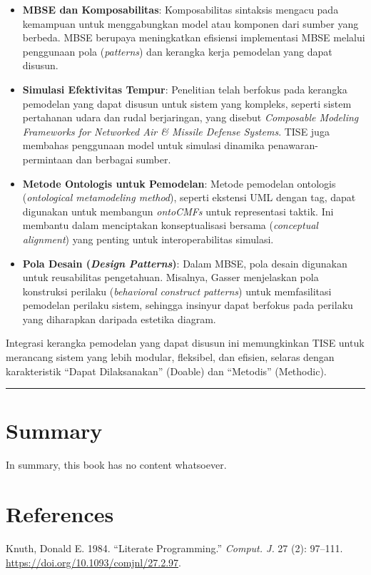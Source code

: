 \documentclass[
  letterpaper,
  DIV=11,
  numbers=noendperiod]{scrreprt}
\newlength{\cslhangindent}
\newenvironment{CSLReferences}[2] %
 {\begin{list}{}{%
  \setlength{\itemindent}{0pt}
  \setlength{\leftmargin}{0pt}
  \setlength{\parsep}{0pt}
  \ifodd #1
   \setlength{\leftmargin}{\cslhangindent}
   \setlength{\itemindent}{-1\cslhangindent}
  \fi
  \setlength{\itemsep}{#2\baselineskip}}}
 {\end{list}}
\providecommand{\tightlist}{%
  \setlength{\itemsep}{0pt}\setlength{\parskip}{0pt}}
\begin{document}
\begin{itemize}
\tightlist
\item
  \textbf{MBSE dan Komposabilitas}: Komposabilitas sintaksis mengacu
  pada kemampuan untuk menggabungkan model atau komponen dari sumber
  yang berbeda. MBSE berupaya meningkatkan efisiensi implementasi MBSE
  melalui penggunaan pola (\emph{patterns}) dan kerangka kerja pemodelan
  yang dapat disusun.
\item
  \textbf{Simulasi Efektivitas Tempur}: Penelitian telah berfokus pada
  kerangka pemodelan yang dapat disusun untuk sistem yang kompleks,
  seperti sistem pertahanan udara dan rudal berjaringan, yang disebut
  \emph{Composable Modeling Frameworks for Networked Air \& Missile
  Defense Systems}. TISE juga membahas penggunaan model untuk simulasi
  dinamika penawaran-permintaan dan berbagai sumber.
\item
  \textbf{Metode Ontologis untuk Pemodelan}: Metode pemodelan ontologis
  (\emph{ontological metamodeling method}), seperti ekstensi UML dengan
  tag, dapat digunakan untuk membangun \emph{ontoCMFs} untuk
  representasi taktik. Ini membantu dalam menciptakan konseptualisasi
  bersama (\emph{conceptual alignment}) yang penting untuk
  interoperabilitas simulasi.
\item
  \textbf{Pola Desain (\emph{Design Patterns})}: Dalam MBSE, pola desain
  digunakan untuk reusabilitas pengetahuan. Misalnya, Gasser menjelaskan
  pola konstruksi perilaku (\emph{behavioral construct patterns}) untuk
  memfasilitasi pemodelan perilaku sistem, sehingga insinyur dapat
  berfokus pada perilaku yang diharapkan daripada estetika diagram.
\end{itemize}

Integrasi kerangka pemodelan yang dapat disusun ini memungkinkan TISE
untuk merancang sistem yang lebih modular, fleksibel, dan efisien,
selaras dengan karakteristik ``Dapat Dilaksanakan'' (Doable) dan
``Metodis'' (Methodic).

\begin{center}\rule{0.5\linewidth}{0.5pt}\end{center}


\chapter{Summary}\label{summary}

In summary, this book has no content whatsoever.


\chapter*{References}\label{references}


\label{refs}
\begin{CSLReferences}{1}{0}
Knuth, Donald E. 1984. {``Literate Programming.''} \emph{Comput. J.} 27
(2): 97--111. \url{https://doi.org/10.1093/comjnl/27.2.97}.

\end{CSLReferences}
\end{document}

